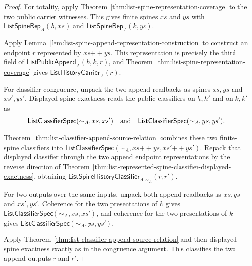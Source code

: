 \begin{proof}
For totality, apply Theorem~\ref{thm:list-spine-representation-coverage} to the
two public carrier witnesses. This gives finite spines $xs$ and $ys$ with
$\mathsf{ListSpineRep}_A(h,xs)$ and $\mathsf{ListSpineRep}_A(k,ys)$.

Apply Lemma~\ref{lem:list-spine-append-representation-construction} to construct
an endpoint $r$ represented by $xs{++}ys$. This representation is precisely the
third field of $\mathsf{ListPublicAppend}_A(h,k,r)$, and
Theorem~\ref{thm:list-spine-representation-coverage} gives
$\mathsf{ListHistoryCarrier}_A(r)$.

For classifier congruence, unpack the two append readbacks as spines $xs,ys$
and $xs',ys'$. Displayed-spine exactness reads the public classifiers on
$h,h'$ and on $k,k'$ as
$$
\mathsf{ListClassifierSpec}(\sim_A,xs,xs')
\quad\hbox{and}\quad
\mathsf{ListClassifierSpec}(\sim_A,ys,ys').
$$

Theorem~\ref{thm:list-classifier-append-source-relation} combines these two
finite-spine classifiers into
$\mathsf{ListClassifierSpec}(\sim_A,xs{++}ys,xs'{++}ys')$. Repack that
displayed classifier through the two append endpoint representations by the
reverse direction of
Theorem~\ref{thm:list-represented-spine-classifier-displayed-exactness},
obtaining $\mathsf{ListSpineHistoryClassifier}_{A,\sim_A}(r,r')$.

For two outputs over the same inputs, unpack both append readbacks as
$xs,ys$ and $xs',ys'$. Coherence for the two presentations of $h$ gives
$\mathsf{ListClassifierSpec}(\sim_A,xs,xs')$, and coherence for the two
presentations of $k$ gives $\mathsf{ListClassifierSpec}(\sim_A,ys,ys')$.

Apply Theorem~\ref{thm:list-classifier-append-source-relation} and then
displayed-spine exactness exactly as in the congruence argument. This classifies
the two append outputs $r$ and $r'$.
\end{proof}

